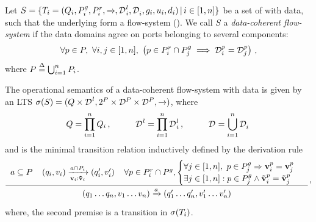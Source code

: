 \begin{definition}
  \label{defn:data:composition}
  Let $S = \setdef{T_i = (Q_i, \pin_i, \pout_i, \goesto{}, \local{\data}_i,
    \data_i, \guard_i, \up_i, \down_i)}{i \in [1,n]}$ be a set of
  \compmodel{} with data, such that the underlying \compmodel{} form a
  flow-system ().  We call $S$ a \emph{data-coherent
    flow-system} if the data domains agree on ports belonging to several
  components:
  \begin{equation}
    \label{eq:data:coherency}
    \forall p \in P,\ \forall i,j \in [1,n],\ 
    \left(
    p \in \pout_i \cap \pin_j \implies \data[p]_i = \data[p]_j
    \right)\,,
  \end{equation}
  where $P \bydef{=} \bigcup_{i=1}^n P_i$.

  The operational semantics of a data-coherent flow-system with data is
  given by an LTS $\undata{S} = (Q \times \local{\data}, 2^P \times
  \data[P] \times \data[P], \goesto{})$, where
  \begin{equation}
    \label{eq:data:parts}
    Q = \prod_{i=1}^n Q_i\,,
    \hspace{1cm}
    \local{\data} = \prod_{i=1}^n \local{\data}_i\,,
    \hspace{1cm}
    \data = \bigcup_{i=1}^n \data_i\,
  \end{equation}
  and \goesto{} is the minimal transition relation inductively defined by
  the derivation rule
  \begin{equation}
    \label{eq:data:composition}
    \renewcommand{\arraystretch}{1.5}
    \derrule[3]{
      a \subseteq P
      &
      (q_i,v_i) 
      \goesto[\portdata{v}_i:\portdata{\tilde{v}}_i]{a \cap P_i}
      (q_i', v_i')
      &
      \forall p \in \pout_i \cap \pin,
      \begin{cases}
      \forall j \in [1,n],\ p \in \pin_j \Rightarrow 
      \portdata{v}_i^p = \portdata{v}_j^p
      \\
      \exists j \in [1,n]: p \in \pin_j \land 
      \portdata{\tilde{v}}^p_i = \portdata{\tilde{v}}^p_j
      \end{cases}
    }{      
      (q_1\dots q_n, v_1\dots v_n)
      \goesto[]{a}
      (q_1'\dots q_n', v_1'\dots v_n')
    }\,,
  \end{equation}
  where, the second premise is a transition in $\undata{T_i}$.
\end{definition}

